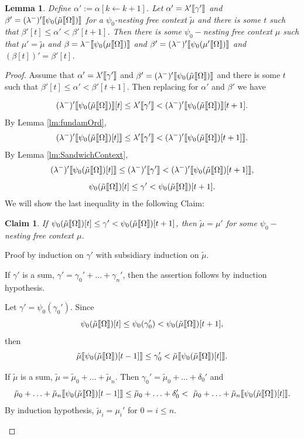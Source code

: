 \documentclass{amsart}
\theoremstyle{plain}
\theoremstyle{plain}
\newtheorem{lemma}[theorem]{Lemma}
\newtheorem{claim}[theorem]{Claim}
\def\scbrl{[\hspace{-.14em}[}
\def\scbrr{]\hspace{-.14em}]}
\def\scbr#1{\scbrl#1\scbrr}
\newcommand{\kp}{[k\leftarrow k+1]}
\newcommand{\Om}{{\Omega}}
\newcommand{\al}{{\alpha}}
\newcommand{\be}{{\beta}}
\newcommand{\ga}{\gamma}
\newcommand{\de}{\delta}
\newcommand{\la}{\lambda}
\def\scbrl{[\hspace{-.14em}[}
\def\scbrr{]\hspace{-.14em}]}
\def\scbr#1{\scbrl#1\scbrr}
\begin{document}
\begin{lemma} \label{lm:BaseChangeContext2}
Define $\al' := \al\kp$.
Let $\al'=\la'\scbr{\ga'}$ and $\be' =(\la^-)'\scbr{\psi_0(\tilde{\mu}\scbr{\Om})}$ for a $\psi_0$-nesting free context $\tilde{\mu}$ and there is some $t$ such that $\be'[t]\leq \al'<\be'[t+1]$.
Then there is some $\psi_0-$nesting free context $\mu$ such that $\mu'=\tilde{\mu}$ and  $\be=\la^-\scbr{\psi_0(\mu\scbr{\Om})}$ and $\be'=(\la^-)'\scbr{\psi_0(\mu'\scbr{\Om})}$ and $(\be[t])' =\be'[t]$.
\end{lemma}
\begin{proof}
Assume that $\al'=\la'\scbr{\ga'}$ and $\be' =(\la^-)'\scbr{\psi_0(\tilde{\mu}\scbr{\Om})}$ and there is some $t$ such that $\be'[t] \leq \al' <\be'[t+1]$. Then replacing for $\al'$ and $\be'$ we have

\[(\la^-)'\scbr{\psi_0(\tilde{\mu}\scbr{\Om})}[t] \leq \la'\scbr{\ga'} < (\la^-)'\scbr{\psi_0(\tilde{\mu}\scbr{\Om})}[t+1].\]
By Lemma \ref{lm:fundamOrd},
\[(\la^-)'\scbr{\psi_0(\tilde{\mu}\scbr{\Om})[t]} \leq \la'\scbr{\ga'} < (\la^-)'\scbr{\psi_0(\tilde{\mu}\scbr{\Om})[t+1]}.\]
By Lemma \ref{lm:SandwichContext},
\[(\la^-)'\scbr{\psi_0(\tilde{\mu}\scbr{\Om})[t]} \leq (\la^-)'\scbr{\ga'} < (\la^-)'\scbr{\psi_0(\tilde{\mu}\scbr{\Om})[t+1]},\]
\[ \psi_0(\tilde{\mu}\scbr{\Om})[t]  \leq \ga' < \psi_0(\tilde{\mu}\scbr{\Om})[t+1].\] \medskip
We will show the last inequality in the following Claim:
\begin{claim}
    If	$\psi_0(\tilde{\mu}\scbr{\Om})[t] \leq \ga' < \psi_0(\tilde{\mu}\scbr{\Om})[t+1]$, then $\tilde{\mu} =\mu'$ for some $\psi_0-$nesting free context $\mu$.
\end{claim}
Proof by induction on $\ga'$ with subsidiary induction on $\tilde{\mu}$.
\begin{Cases}
    \item   If $\ga'$ is a sum, $\ga' = \ga_0' +\ldots +\ga_n'$, then the assertion follows by induction hypothesis. 
    
    \item Let $\ga' = \psi_0(\ga_0')$. Since 
    $$\psi_0(\tilde{\mu}\scbr{\Om})[t] \leq \psi_0(\ga_0') < \psi_0(\tilde{\mu}\scbr{\Om})[t+1],$$
    then 
    $$\tilde{\mu}\scbr{\psi_0(\tilde{\mu}\scbr{\Om})[t-1]} \leq \ga_0' < \tilde{\mu}\scbr{\psi_0(\tilde{\mu}\scbr{\Om})[t]}.$$
    \begin{Cases}
      \item  If $\tilde{\mu}$ is a sum, $\tilde{\mu} = \tilde{\mu}_0+\ldots +\tilde{\mu}_n$. Then $\ga_0'= \tilde{\mu}_0+\ldots + \de_0'$ and 
         $$\tilde{\mu}_0+\ldots + \tilde{\mu}_n\scbr{\psi_0(\tilde{\mu}\scbr{\Om})[t-1]} \leq \tilde{\mu}_0+ \ldots + \de_0' < \ \tilde{\mu}_0+\ldots+ \tilde{\mu}_n\scbr{\psi_0(\tilde{\mu}\scbr{\Om})[t]}.$$
    By induction hypothesis, $\tilde{\mu}_i=\mu_i'$ for $0=i\leq n$.\smallskip
    

\end{Cases}
\end{Cases}
\end{proof}
\end{document}
